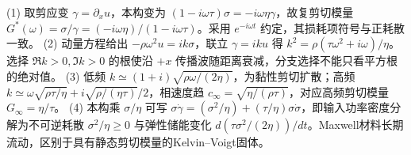 (1) 取剪应变 \(\gamma=\partial_xu\)，本构变为 \((1-i\omega\tau)\sigma=-i\omega\eta\gamma\)，故复剪切模量 \(G^*(\omega)=\sigma/\gamma=(-i\omega\eta)/(1-i\omega\tau)\)。采用 \(e^{-i\omega t}\) 约定，其损耗项符号与正耗散一致。
(2) 动量方程给出 \(-\rho\omega^2u=ik\sigma\)，联立 \(\gamma=iku\) 得 \(k^2=\rho(\tau\omega^2+i\omega)/\eta\)。选择 \(\Re k>0,\Im k>0\) 的根使沿 \(+x\) 传播波随距离衰减，分支选择不能只看平方根的绝对值。
(3) 低频 \(k\simeq(1+i)\sqrt{\rho\omega/(2\eta)}\)，为黏性剪切扩散；高频 \(k\simeq\omega\sqrt{\rho\tau/\eta}+i\sqrt{\rho/(\eta\tau)}/2\)，相速度趋 \(c_\infty=\sqrt{\eta/(\rho\tau)}\)，对应高频剪切模量 \(G_\infty=\eta/\tau\)。
(4) 本构乘 \(\sigma/\eta\) 可写 \(\sigma\dot\gamma=(\sigma^2/\eta)+(\tau/\eta)\sigma\dot\sigma\)，即输入功率密度分解为不可逆耗散 \(\sigma^2/\eta\ge0\) 与弹性储能变化 \(d(\tau\sigma^2/(2\eta))/dt\)。Maxwell材料长期流动，区别于具有静态剪切模量的Kelvin--Voigt固体。
